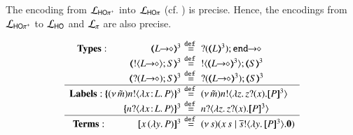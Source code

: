 \smallskip 

\begin{theorem}
\label{f:enc:hopiptohopi}
The encoding from $\mathcal{L}_{\mathsf{HO\pi^{+}}}$ into $\mathcal{L}_{\mathsf{HO}\pi}$ (cf. )
is precise. Hence, the encodings 
from $\mathcal{L}_{\mathsf{HO\pi^{+}}}$ to $\mathcal{L}_{\mathsf{HO}}$ 
and $\mathcal{L}_{\pi}$ 
are also precise. 
\end{theorem}
\smallskip 

\begin{figure}[t]
\[
{\small
\begin{array}{rcll}
\noindent{\bf Types:} \ \hspace{1.5cm}  
		\tmap{\shot{L}}{3} &\!\!\!\!\defeq\!\!\!\!& \shot{\btinp{\tmap{L}{3}} \tinact}
		\\
		\tmap{\btout{\shot{L}} S}{3} &\!\!\!\!\defeq\!\!\!\!& \btout{\tmap{\shot{L}}{3}} \tmap{S}{3}
		\\
		\tmap{\btinp{\shot{L}} S}{3} &\!\!\!\!\defeq\!\!\!\!& \btinp{\tmap{\shot{L}}{3}} \tmap{S}{3}
\\
\hline
\noindent{\bf Labels:} \  
		\mapa{\news{\tilde{m}} \bactout{n}{\abs{\AT{x}{L}}{P}}}^{3} &\!\!\!\!\defeq\!\!\!\!& \news{\tilde{m}} \bactout{n}{\abs{z}{\binp{z}{x} \pmap{P}{3}}}
		\\
		\mapa{\bactinp{n}{\abs{\AT{x}{L}}{P}}}^{3} &\!\!\!\!\defeq\!\!\!\!& \bactinp{n}{\abs{z}{\binp{z}{x} \pmap{P}{3}}}
\\
\hline
{\bf Terms}: \hspace{1.1cm} 
\pmap{\appl{x}{(\abs{y} P)}}{3} &
\!\!\!\!\defeq\!\!\!\!& 
\newsp{s}{\appl{x}{s} \Par \bout{\dual{s}}{\abs{y} \pmap{P}{3}} \inact}
		\\


\end{array}}\]
\end{figure}
